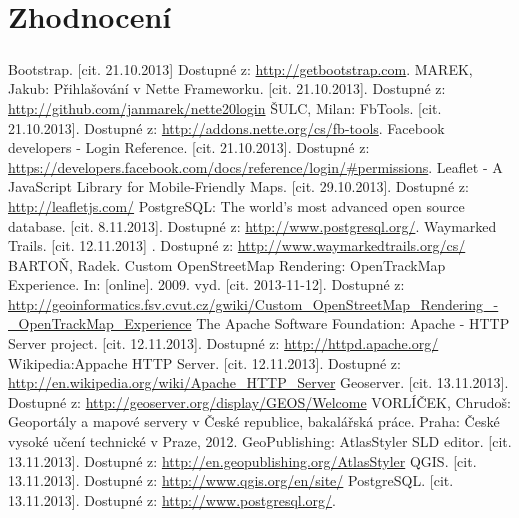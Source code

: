 \documentclass[11pt,a4paper,titlepage,oneside]{book}
\begin{document}
	\chapter{Zhodnocení}
		\paragraph{}

\newpage
{}
\begin{thebibliography}{50}
	Bootstrap. [cit. 21.10.2013] Dostupné z: \url{http://getbootstrap.com}.
	MAREK, Jakub: Přihlašování v Nette Frameworku. [cit. 21.10.2013]. Dostupné z: \url{http://github.com/janmarek/nette20login}
	 ŠULC, Milan: FbTools. [cit. 21.10.2013]. Dostupné z: \url{http://addons.nette.org/cs/fb-tools}.
	 Facebook developers - Login Reference. [cit. 21.10.2013]. Dostupné z: \url{https://developers.facebook.com/docs/reference/login/#permissions}.
		Leaflet - A JavaScript Library for Mobile-Friendly Maps. [cit. 29.10.2013]. Dostupné z: \url{http://leafletjs.com/}
	 PostgreSQL: The world's most advanced open source database. [cit. 8.11.2013]. Dostupné z: \url{http://www.postgresql.org/}.
	 Waymarked Trails.  [cit. 12.11.2013] . Dostupné z: \url{http://www.waymarkedtrails.org/cs/}
	 BARTOŇ, Radek. Custom OpenStreetMap Rendering: OpenTrackMap Experience. In: [online]. 2009. vyd. [cit. 2013-11-12]. Dostupné z: \url{http://geoinformatics.fsv.cvut.cz/gwiki/Custom_OpenStreetMap_Rendering_-_OpenTrackMap_Experience}
	The Apache Software Foundation: Apache - HTTP Server project. [cit. 12.11.2013]. Dostupné z: \url{http://httpd.apache.org/}
	Wikipedia:Appache HTTP Server. [cit. 12.11.2013]. Dostupné z: \url{http://en.wikipedia.org/wiki/Apache_HTTP_Server}
	Geoserver. [cit. 13.11.2013]. Dostupné z: \url{http://geoserver.org/display/GEOS/Welcome}
	VORLÍČEK, Chrudoš: Geoportály a mapové servery v České republice, bakalářská práce. Praha: České vysoké učení technické v Praze, 2012.
	GeoPublishing: AtlasStyler SLD editor. [cit. 13.11.2013]. Dostupné z: \url{http://en.geopublishing.org/AtlasStyler}
	QGIS. [cit. 13.11.2013]. Dostupné z: \url{http://www.qgis.org/en/site/}
	 PostgreSQL. [cit. 13.11.2013]. Dostupné z: \url{http://www.postgresql.org/}.
\end{thebibliography}
\end{document}
